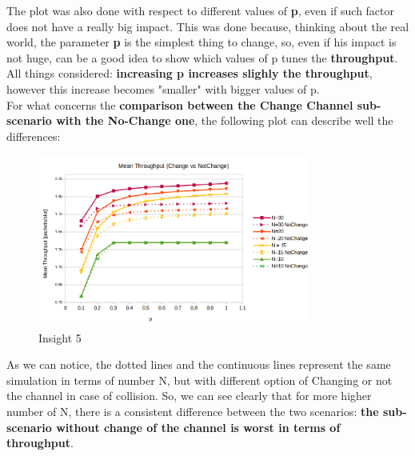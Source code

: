 The plot was also done with respect to different values of \textbf{p}, even if such factor does not have a really big impact. This was done because, thinking about the real world, the parameter \textbf{p} is the simplest thing to change, so, even if his impact is not huge, can be a good idea to show which values of p tunes the \textbf{throughput}. All things considered: \textbf{increasing p increases slighly the throughput}, however this increase becomes "smaller" with bigger values of p.\\
For what concerns the \textbf{comparison between the Change Channel sub-scenario with the No-Change one}, the following plot can describe well the differences:
\begin{figure}[H]
	\centering
	\includegraphics[width=0.8\textwidth]{img/MeanThroughputBufferExplosionChangeVSNoChange.png}
	\caption{Insight 5}
	\label{img: insight3_respTime}
\end{figure}
As we can notice, the dotted lines and the continuous lines represent the same simulation in terms of number N, but with different option of Changing or not the channel in case of collision. So, we can see clearly that for more higher number of N, there is a consistent difference between the two scenarios: \textbf{the sub-scenario without change of the channel is worst in terms of throughput}.